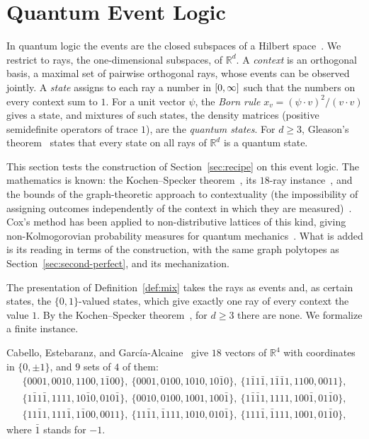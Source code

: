 \section{Quantum Event Logic}
\label{sec:quantum}

In quantum logic the events are the closed subspaces of a Hilbert
space~\cite{birkhoff-vonneumann1936}. We restrict to rays, the
one-dimensional subspaces, of $\mathbb{R}^d$. A \emph{context} is an
orthogonal basis, a maximal set of pairwise orthogonal rays, whose events
can be observed jointly. A \emph{state} assigns to each ray a number in
$[0,\infty]$ such that the numbers on every context sum to $1$. For a unit
vector $\psi$, the \emph{Born rule} $x_v = (\psi \cdot v)^2 / (v \cdot
v)$ gives a state, and mixtures of such states, the density matrices
(positive semidefinite operators of trace $1$), are the \emph{quantum
states}. For $d \ge 3$, Gleason's
theorem~\cite{gleason1957} states that every state on all rays of
$\mathbb{R}^d$ is a quantum state.

This section tests the construction of Section~\ref{sec:recipe} on this
event logic. The mathematics is known: the Kochen--Specker
theorem~\cite{kochen-specker1967}, its $18$-ray
instance~\cite{cabello1996}, and the bounds of the graph-theoretic
approach to contextuality (the impossibility of assigning outcomes
independently of the context in which they are measured)~\cite{cabello2014}. Cox's method has been
applied to non-distributive lattices of this kind, giving
non-Kolmogorovian probability measures for quantum
mechanics~\cite{holik2014}. What is added is its
reading in terms of the construction, with the same graph polytopes as
Section~\ref{sec:second-perfect}, and its mechanization.

The presentation of Definition~\ref{def:mix} takes the rays as events
and, as certain states, the $\{0,1\}$-valued states, which give
exactly one ray of every context the value $1$. By the Kochen--Specker
theorem~\cite{kochen-specker1967}, for $d \ge 3$ there are none. We
formalize a finite instance.

\begin{definition}
\label{def:cabello}
Cabello, Estebaranz, and Garc\'ia-Alcaine~\cite{cabello1996} give $18$
vectors of $\mathbb{R}^4$ with coordinates in $\{0, \pm 1\}$, and $9$ sets
of $4$ of them:
\[
\begin{array}{l}
\{0001, 0010, 1100, 1\bar{1}00\},\ \{0001, 0100, 1010, 10\bar{1}0\},\
\{1\bar{1}1\bar{1}, 1\bar{1}\bar{1}1, 1100, 0011\},\\
\{1\bar{1}1\bar{1}, 1111, 10\bar{1}0, 010\bar{1}\},\
\{0010, 0100, 1001, 100\bar{1}\},\ \{1\bar{1}\bar{1}1, 1111, 100\bar{1}, 01\bar{1}0\},\\
\{11\bar{1}1, 111\bar{1}, 1\bar{1}00, 0011\},\
\{11\bar{1}1, \bar{1}111, 1010, 010\bar{1}\},\
\{111\bar{1}, \bar{1}111, 1001, 01\bar{1}0\},
\end{array}
\]
where $\bar{1}$ stands for $-1$.
\end{definition}


